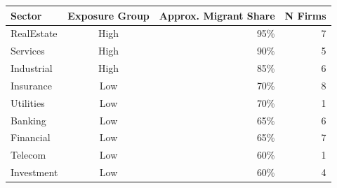 \begin{tabular}{lcrr}
  \toprule
Sector & Exposure Group & Approx. Migrant Share & N Firms \\ 
  \midrule
RealEstate & High & 95\% &   7 \\ 
  Services & High & 90\% &   5 \\ 
  Industrial & High & 85\% &   6 \\ 
  Insurance & Low & 70\% &   8 \\ 
  Utilities & Low & 70\% &   1 \\ 
  Banking & Low & 65\% &   6 \\ 
  Financial & Low & 65\% &   7 \\ 
  Telecom & Low & 60\% &   1 \\ 
  Investment & Low & 60\% &   4 \\ 
   \bottomrule
\end{tabular}
